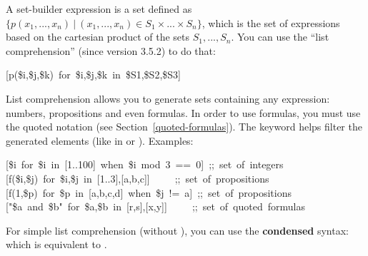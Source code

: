 {\noindent A set-builder expression is a set defined as
$\{p(x_1,...,x_n)~|~(x_1,...,x_n) \in S_1 \times ... \times S_n \}$,
which is the set of expressions based on the cartesian product of
the sets $S_1,...,S_n$. You can use the \textquotedblleft{}list comprehension\textquotedblright{} (since
version 3.5.2) to do that:%
\begin{mdpre}%
\noindent{}[p({\$i},{\$j},{\$k})~{for}~{\$i},{\$j},{\$k}~{in}~{\$S1},{\$S2},{\$S3}]%
\end{mdpre}\noindent List comprehension allows you to generate sets containing any expression:
numbers, propositions and even formulas. In order to use formulas, you
must use the quoted notation (see Section~\ref{quoted-formulas}). The 
keyword helps filter the generated elements (like in  or
). Examples:
\begin{mdpre}%
\noindent{}[{\$i}~{for}~{\$i}~{in}~{}[{1}..{100}]~{when}~{\$i}~{mod}~{3}~==~{0}]~{;;~set~of~integers}\\
{}[f({\$i},{\$j})~{for}~{\$i},{\$j}~{in}~{}[{1}..{3}],{}[a,b,c]]~~~~~{;;~set~of~propositions}\\
{}[f({1},{\$p})~{for}~{\$p}~{in}~{}[a,b,c,d]~{when}~{\$j}~!=~a]~{;;~set~of~propositions}\\
{}["{\$a}~and~{\$b}"~{for}~{\$a},{\$b}~{in}~{}[r,s],{}[x,y]]~~~~~{;;~set~of~quoted~formulas}%
\end{mdpre}\noindent For simple list comprehension (without ), you can use the
\textbf{condensed} syntax:  which is equivalent to
.

}
